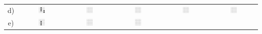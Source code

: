 \begin{tabular}{cccccc}
d) &
\includegraphics[width=0.15\textwidth]{./inf/SEKII/18_Java_Arrays/GoL5.png} &
\includegraphics[width=0.15\textwidth]{./inf/SEKII/18_Java_Arrays/GoL.png} &
\includegraphics[width=0.15\textwidth]{./inf/SEKII/18_Java_Arrays/GoL.png} &
\includegraphics[width=0.15\textwidth]{./inf/SEKII/18_Java_Arrays/GoL.png} &
\includegraphics[width=0.15\textwidth]{./inf/SEKII/18_Java_Arrays/GoL.png} \\
e) &
\includegraphics[width=0.15\textwidth]{./inf/SEKII/18_Java_Arrays/GoL6.png} &
\includegraphics[width=0.15\textwidth]{./inf/SEKII/18_Java_Arrays/GoL.png} &
\includegraphics[width=0.15\textwidth]{./inf/SEKII/18_Java_Arrays/GoL.png} &

\end{tabular}
